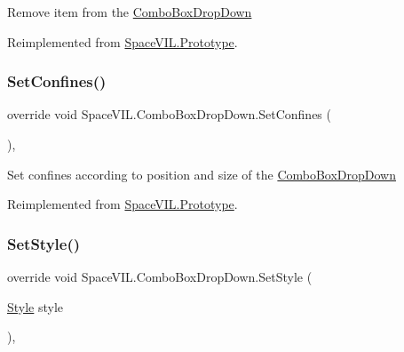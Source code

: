 Remove item from the \mbox{\hyperlink{class_space_v_i_l_1_1_combo_box_drop_down}{Combo\+Box\+Drop\+Down}} 



Reimplemented from \mbox{\hyperlink{class_space_v_i_l_1_1_prototype_a7a2aabccfe6389f71d0265fa73f0ae87}{Space\+V\+I\+L.\+Prototype}}.

\mbox{\label{class_space_v_i_l_1_1_combo_box_drop_down_a236066889e0b652410d02de2b4cb51c7}} 
\subsubsection{\texorpdfstring{Set\+Confines()}{SetConfines()}}
{\footnotesize\ttfamily override void Space\+V\+I\+L.\+Combo\+Box\+Drop\+Down.\+Set\+Confines (\begin{DoxyParamCaption}{ }\end{DoxyParamCaption})\hspace{0.3cm}{\ttfamily [inline]}, {\ttfamily [virtual]}}



Set confines according to position and size of the \mbox{\hyperlink{class_space_v_i_l_1_1_combo_box_drop_down}{Combo\+Box\+Drop\+Down}} 



Reimplemented from \mbox{\hyperlink{class_space_v_i_l_1_1_prototype_af063fd80d51a3c42c8f43e0e97b6b809}{Space\+V\+I\+L.\+Prototype}}.

\mbox{\label{class_space_v_i_l_1_1_combo_box_drop_down_ad400783300d69cd5b90ebdb8400aa4a6}} 
\subsubsection{\texorpdfstring{Set\+Style()}{SetStyle()}}
{\footnotesize\ttfamily override void Space\+V\+I\+L.\+Combo\+Box\+Drop\+Down.\+Set\+Style (\begin{DoxyParamCaption}\item[{\mbox{\hyperlink{class_space_v_i_l_1_1_decorations_1_1_style}{Style}}}]{style }\end{DoxyParamCaption})\hspace{0.3cm}{\ttfamily [inline]}, {\ttfamily [virtual]}}



